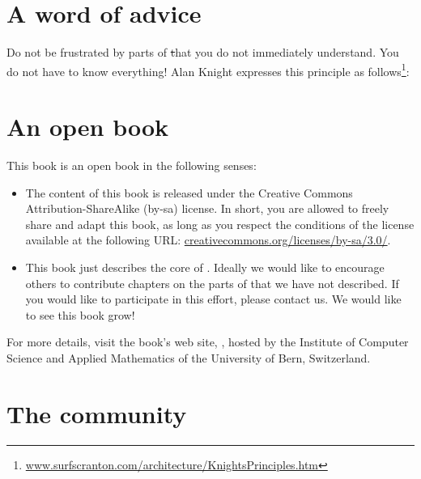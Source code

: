 \documentclass[a4paper,10pt,twoside]{book}
\begin{document}
\section*{A word of advice}


Do not be frustrated by parts of \st that you do not immediately understand.
You do not have to know everything!
Alan Knight expresses this principle as follows\footnote{\url{www.surfscranton.com/architecture/KnightsPrinciples.htm}}:

\section*{An open book}

This book is an open book in the following senses: 

\begin{itemize}

\item	The content of this book is released under the Creative Commons Attribution-ShareAlike (by-sa) license.
		In short, you are allowed to freely share and adapt this book, as long as you respect the conditions of the license available at the following URL: 
		\url{creativecommons.org/licenses/by-sa/3.0/}.

\item	This book just describes the core of \squeak.
		Ideally we would like to encourage others to contribute chapters
		on the parts of \squeak that we have not described.
		If you would like to participate in this effort, please
		contact us.  We would like to see this book grow!
\end{itemize}

For more details, visit the book's web site, \sbe, hosted by the Institute of Computer Science and Applied Mathematics of the University of Bern, Switzerland.

\section*{The \squeak community}
\end{document}

